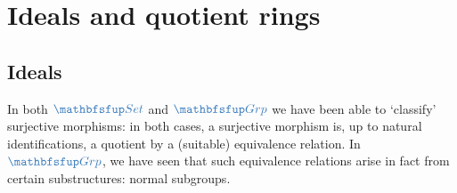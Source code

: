 \section{Ideals and quotient rings}
\label{sec:rings:ideals-and-quotient-rings}


\subsection{Ideals}
\label{subsec:rings:ideals}
In both $\categ{Set}$ and $\categ{Grp}$ we have been able to
`classify' surjective morphisms: in both cases, a surjective morphism
is, up to natural identifications, a quotient by a (suitable)
equivalence relation. In $\categ{Grp}$, we have seen that such
equivalence relations arise in fact from certain substructures: normal
subgroups.

